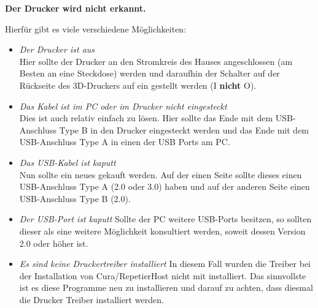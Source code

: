 \documentclass[11pt,a4paper]{scrartcl}
\begin{document}
\begin{description}
\item \textbf{Der Drucker wird nicht erkannt.}\\
Hierfür gibt es viele verschiedene Möglichkeiten:
\begin{itemize}
\item \textit{Der Drucker ist aus}\\
Hier sollte der Drucker an den Stromkreis des Hauses angeschlossen (am Besten an eine Steckdose) werden und daraufhin der Schalter auf der Rückseite des 3D-Druckers auf ein gestellt werden (I \textbf{nicht} O).
\item \textit{Das Kabel ist im PC oder im Drucker nicht eingesteckt}\\
Dies ist auch relativ einfach zu lösen. Hier sollte das Ende mit dem USB-Anschluss Type B in den Drucker eingesteckt werden und das Ende mit dem USB-Anschluss Type A in einen der USB Ports am PC.
\item \textit{Das USB-Kabel ist kaputt}\\
Nun sollte ein neues gekauft werden. Auf der einen Seite sollte dieses einen USB-Anschluss Type A (2.0 oder 3.0) haben und auf der anderen Seite einen USB-Anschluss Type B (2.0).
\item \textit{Der USB-Port ist kaputt}
Sollte der PC weitere USB-Ports besitzen, so sollten dieser als eine weitere Möglichkeit konsultiert werden, soweit dessen Version 2.0 oder höher ist.
\item \textit{Es sind keine Druckertreiber installiert}
In diesem Fall wurden die Treiber bei der Installation von Cura/RepetierHost nicht mit installiert. Das sinnvollste ist es diese Programme neu zu installieren und darauf zu achten, dass diesmal die Drucker Treiber installiert werden.
\end{itemize}
\end{description}
\end{document}

